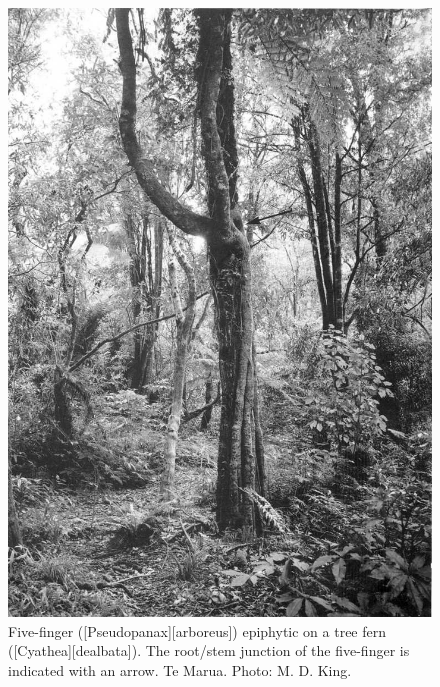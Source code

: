 \begin{figure}[htb]
	\centering
	\begin{minipage}[t]{0.505\textwidth}
		\centering
		\includegraphics[width=\textwidth]{graphics/figure55fivefinger.jpg}
    	\caption[Five-finger epiphytic on a tree fern]{Five-finger ([Pseudopanax][arboreus]) epiphytic on a tree fern ([Cyathea][dealbata]). The root/stem junction of the five-finger is indicated with an arrow. Te Marua. Photo:  M. D. King.}%
    	\label{fig:55fivefinger}
	\end{minipage}\hfill%
	\begin{minipage}[t]{0.475\textwidth}
    	\centering

\end{minipage}
\end{figure}
